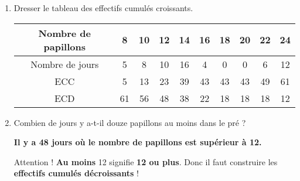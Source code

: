 \begin{enumerate}
\item  Dresser le tableau des effectifs cumulés croissants.

\begin{tabular}{|c|c|c|c|c|c|c|c|c|c|}
\hline 
Nombre de papillons &8 &10 &12 &14 &16& 18 &20& 22 &24\\
\hline 
Nombre de jours &5& 8 &10& 16& 4& 0& 0& 6& 12\\
\hline 
ECC & 5& 13 &23& 39& 43& 43& 43& 49& 61\\
\hline 
ECD &61& 56 &48& 38& 22& 18& 18& 18& 12\\
\hline

\end{tabular} 


\item  Combien de jours y a-t-il douze papillons au moins dans le pré ?
\vspace{0.5cm}

\textbf{Il y a 48 jours où le nombre de papillons est supérieur à 12.}


\vspace{0.5cm}

Attention ! \textbf{Au moins} 12 signifie \textbf{12 ou plus}. Donc il faut construire les \textbf{effectifs cumulés décroissants} !

\end{enumerate}